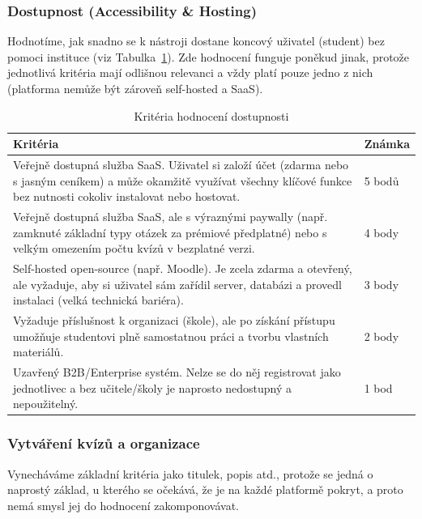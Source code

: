 \documentclass{vskpou} %
\begin{document}
\subsubsection{Dostupnost (Accessibility \& Hosting)}

Hodnotíme, jak snadno se k nástroji dostane koncový uživatel (student) bez pomoci instituce (viz Tabulka~\ref{tab:dostupnost}). Zde hodnocení funguje poněkud jinak, protože jednotlivá kritéria mají odlišnou relevanci a vždy platí pouze jedno z nich (platforma nemůže být zároveň self-hosted a SaaS).

\begin{table}[htbp]
\caption{Kritéria hodnocení dostupnosti}
\label{tab:dostupnost}
\centering
\begin{tabular}{|p{}|l|}
\hline
\textbf{Kritéria} & \textbf{Známka} \\ \hline
Veřejně dostupná služba SaaS. Uživatel si založí účet (zdarma nebo s jasným ceníkem) a může okamžitě využívat všechny klíčové funkce bez nutnosti cokoliv instalovat nebo hostovat. & 5 bodů \\ \hline
Veřejně dostupná služba SaaS, ale s výraznými paywally (např. zamknuté základní typy otázek za prémiové předplatné) nebo s velkým omezením počtu kvízů v bezplatné verzi. & 4 body \\ \hline
Self-hosted open-source (např. Moodle). Je zcela zdarma a otevřený, ale vyžaduje, aby si uživatel sám zařídil server, databázi a provedl instalaci (velká technická bariéra). & 3 body \\ \hline
Vyžaduje příslušnost k organizaci (škole), ale po získání přístupu umožňuje studentovi plně samostatnou práci a tvorbu vlastních materiálů. & 2 body \\ \hline
Uzavřený B2B/Enterprise systém. Nelze se do něj registrovat jako jednotlivec a bez učitele/školy je naprosto nedostupný a nepoužitelný. & 1 bod \\ \hline
\end{tabular}
\end{table}

\subsubsection{Vytváření kvízů a organizace}

Vynecháváme základní kritéria jako titulek, popis atd., protože se jedná o naprostý základ, u kterého se očekává, že je na každé platformě pokryt, a proto nemá smysl jej do hodnocení zakomponovávat.
\end{document}
